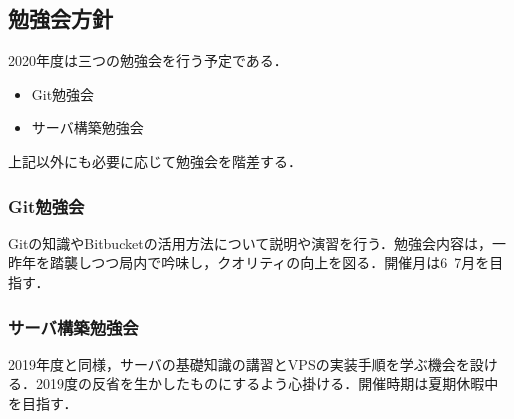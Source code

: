 \subsection*{勉強会方針}


2020年度は三つの勉強会を行う予定である．
 \begin{itemize}
\item Git勉強会
\item サーバ構築勉強会
 \end{itemize}
上記以外にも必要に応じて勉強会を階差する．

\subsubsection*{Git勉強会}
Gitの知識やBitbucketの活用方法について説明や演習を行う．勉強会内容は，一昨年を踏襲しつつ局内で吟味し，クオリティの向上を図る．開催月は6~7月を目指す．
\subsubsection*{サーバ構築勉強会}
2019年度と同様，サーバの基礎知識の講習とVPSの実装手順を学ぶ機会を設ける．2019度の反省を生かしたものにするよう心掛ける．開催時期は夏期休暇中を目指す．


